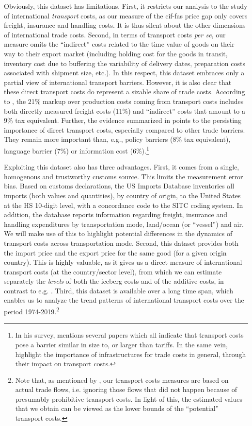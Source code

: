 \documentclass[a4paper,11pt]{article}
\begin{document}
Obviously, this dataset has limitations.
First, it restricts our analysis to the study of international \emph{transport}  costs, as our measure of the cif-fas price gap only covers freight, insurance and handling costs.
It is thus silent about the other dimensions of international trade costs.
Second, in terms of transport costs \textit{per se}, our measure omits the ``indirect'' costs related to the time value of goods on their way to their export market (including holding cost for the goods in transit, inventory cost due to buffering the variability of delivery dates, preparation costs associated with shipment size, etc.).
In this respect, this dataset embraces only a partial view of international transport barriers.
However, it is also clear that these direct transport costs do represent a sizable share of trade costs.
According to \cite{anderson_wincoop_jel}, the 21\% markup over production costs coming from transport costs includes both directly measured freight costs (11\%) and ``indirect'' costs that amount to a  9\% tax equivalent.
Further, the evidence summarized in \cite{anderson_wincoop_jel} points to the persisting importance of direct transport costs, especially compared to other trade barriers.
They remain more important than, e.g., policy barriers (8\% tax equivalent), language barrier (7\%) or information cost (6\%).\footnote{In his survey, \cite{Hummels_1999} mentions several papers which all indicate that transport costs pose a barrier similar in size to, or larger than tariffs.
In the same vein, \cite{limao_venables} highlight the importance of infrastructures for trade costs in general, through their impact on transport costs.}

Exploiting this dataset also has three advantages.
First, it comes from a single, homogenous and trustworthy customs source.
This limits the measurement error bias.
Based on customs declarations, the US Imports Database inventories all imports (both values and quantities), by country of origin, to the United States at the HS 10-digit level, with a concordance code to the SITC coding system. In addition, the database reports information regarding freight, insurance and handling expenditures by transportation mode, land/ocean (or ``vessel'') and air. We will make use of this to highlight potential differences in the dynamics of transport costs across transportation mode.
Second, this dataset provides both the import price and the export price for the same good (for a given origin country).
This is highly valuable, as it gives us a direct measure of international transport costs (at the country/sector level), from which we can estimate separately the \textit{levels} of both the iceberg costs and of the additive costs, in contrast to e.g. \cite{Irrazabal_2015}.
Third, this dataset is available over a long time span, which enables us to analyze the trend patterns of international transport costs over the period 1974-2019.\footnote{Note that, as mentioned by \cite{Lafourcade_Thisse}, our transport costs measures are based on actual trade flows, i.e. ignoring those flows that did not happen because of presumably prohibitive transport costs.
In light of this, the estimated values that we obtain can be viewed as the lower bounds of the ``potential'' transport costs.} \smallskip
\end{document}
